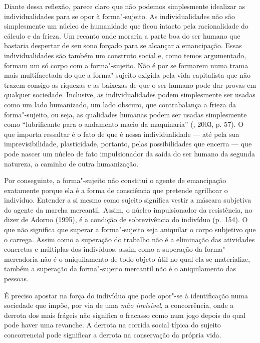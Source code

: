 Diante dessa reflexão, parece claro que não podemos simplesmente
idealizar as individualidades para se opor à forma"-sujeito. As
individualidades não são simplesmente um núcleo de humanidade que ficou
intacto pela racionalidade do cálculo e da frieza. Um recanto onde
moraria a parte boa do ser humano que bastaria despertar de seu sono
forçado para se alcançar a emancipação. Essas individualidades são
também um construto social e, como temos argumentado, formam um só corpo com
a forma"-sujeito. Não é por se formarem numa trama mais multifacetada do
que a forma"-sujeito exigida pela vida capitalista que não trazem consigo
as riquezas e as baixezas de que o ser humano pode dar provas em
qualquer sociedade. Inclusive, as individualidades podem simplesmente
ser usadas como um lado humanizado, um lado obscuro, que contrabalança a
frieza da forma"-sujeito, ou seja, as qualidades humanas podem ser usadas
simplesmente como ``lubrificante para o andamento macio da maquinaria''
(, 2003, p. 57). O que importa ressaltar é o fato de que é
nessa individualidade --- até pela sua imprevisibilidade, plasticidade,
portanto, pelas possibilidades que encerra --- que pode nascer um núcleo
de fato impulsionador da saída do ser humano da segunda natureza, a
caminho de outra humanização.

Por conseguinte, a forma"-sujeito não constitui o agente de emancipação
exatamente porque ela é a forma de consciência que pretende agrilhoar o
indivíduo. Entender a si mesmo como sujeito significa vestir a máscara
subjetiva do agente da marcha mercantil. Assim, o núcleo impulsionador
da resistência, no dizer de Adorno (1995), é a condição de sobrevivência
do indivíduo (p.~154). O que não significa que superar a forma"-sujeito
seja aniquilar o corpo subjetivo que o carrega. Assim como a superação
do trabalho não é a eliminação das atividades concretas e múltiplas dos
indivíduos, assim como a superação da forma"-mercadoria não é o
aniquilamento de todo objeto útil no qual ela se materialize, também a
superação da forma"-sujeito mercantil não é o aniquilamento das pessoas.

É preciso apostar na força do indivíduo que pode opor"-se à identificação
numa sociedade que impõe, por via de uma \emph{mão invisível}, a
concorrência, onde a derrota dos mais frágeis não significa o fracasso
como num jogo depois do qual pode haver uma revanche. A derrota na
corrida social típica do sujeito concorrencial pode significar a derrota
na conservação da própria vida.

